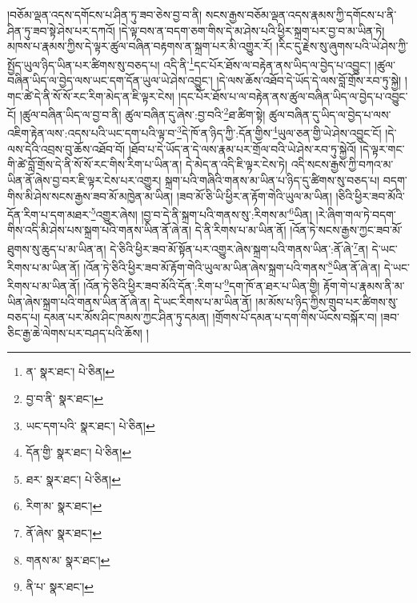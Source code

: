 །བཅོམ་ལྡན་འདས་དགོངས་པ་ཤིན་ཏུ་ཟབ་ཅེས་བྱ་བ་ནི། སངས་རྒྱས་བཅོམ་ལྡན་འདས་རྣམས་ཀྱི་དགོངས་པ་ནི་ཤིན་ཏུ་ཟབ་སྟེ་ཤེས་པར་དཀའོ། །དེ་ལྟ་བས་ན་བདག་ཅག་གིས་དེ་མ་ཤེས་པའི་ཕྱིར་སྐྲག་པར་བྱ་བ་མ་ཡིན་ཏེ། མཁས་པ་རྣམས་ཀྱིས་དེ་ལྟར་ཚུལ་བཞིན་བརྟགས་ན་སྐྲག་པར་མི་འགྱུར་རོ། །རིང་དུ་རྗེས་སུ་ཞུགས་པའི་ཡེ་ཤེས་ཀྱི་སྤྱོད་ཡུལ་ཉིད་ཡིན་པར་ཚིགས་སུ་བཅད་པ། འདི་ནི་\footnote{ན་  སྣར་ཐང་།  པེ་ཅིན། }དང་པོར་ཐོས་ལ་བརྟེན་ནས་ཡིད་ལ་བྱེད་པ་འབྱུང་། །ཚུལ་བཞིན་ཡིད་ལ་བྱེད་ལས་ཡང་དག་དོན་ཡུལ་ཡེ་ཤེས་འབྱུང་། །དེ་ལས་ཆོས་འཐོབ་དེ་ཡོད་དེ་ལས་བློ་གྲོས་རབ་ཏུ་སྐྱེ། །གང་ཚེ་དེ་ནི་སོ་སོ་རང་རིག་མེད་ན་ཇི་ལྟར་ངེས། །དང་པོར་ཐོས་པ་ལ་བརྟེན་ནས་ཚུལ་བཞིན་ཡིད་ལ་བྱེད་པ་འབྱུང་ངོ། །ཚུལ་བཞིན་ཡིད་ལ་བྱ་བ་ནི། ཚུལ་བཞིན་དུ་ཞེས་:བྱ་བའི་\footnote{བྱ་བ་ནི་  སྣར་ཐང་། }ཐ་ཚིག་སྟེ། ཚུལ་བཞིན་དུ་ཡིད་ལ་བྱེད་པ་ལས་འཇིག་རྟེན་ལས་:འདས་པའི་ཡང་དག་པའི་ལྟ་བ་\footnote{ཡང་དག་པའི་  སྣར་ཐང་།  པེ་ཅིན། }དེ་ཁོ་ན་ཉིད་ཀྱི་:དོན་གྱིས་\footnote{དོན་གྱི་  སྣར་ཐང་།  པེ་ཅིན། }ཡུལ་ཅན་གྱི་ཡེ་ཤེས་འབྱུང་ངོ། །དེ་ལས་དེའི་འབྲས་བུ་ཆོས་འཐོབ་བོ། །ཐོབ་པ་དེ་ཡོད་ན་དེ་ལས་རྣམ་པར་གྲོལ་བའི་ཡེ་ཤེས་རབ་ཏུ་སྐྱེའོ། །དེ་ལྟར་གང་གི་ཚེ་བློ་གྲོས་དེ་ནི་སོ་སོ་རང་གིས་རིག་པ་ཡིན་ན། དེ་མེད་ན་འདི་ཇི་ལྟར་ངེས་ཏེ། འདི་སངས་རྒྱས་ཀྱི་བཀའ་མ་ཡིན་ནོ་ཞེས་བྱ་བར་ཇི་ལྟར་ངེས་པར་འགྱུར། སྐྲག་པའི་གཞིའི་གནས་མ་ཡིན་པ་ཉིད་དུ་ཚིགས་སུ་བཅད་པ། བདག་གིས་མི་ཤེས་སངས་རྒྱས་ཟབ་མོ་མཁྱེན་མ་ཡིན། །ཟབ་མོ་ཅི་ཡི་ཕྱིར་ན་རྟོག་གེའི་ཡུལ་མ་ཡིན། །ཅིའི་ཕྱིར་ཟབ་མོའི་དོན་རིག་པ་དག་མཐར་\footnote{ཐར་  སྣར་ཐང་།  པེ་ཅིན། }འགྱུར་ཞེས། །བྱ་བ་དེ་ནི་སྐྲག་པའི་གནས་སུ་:རིགས་མ་\footnote{རིག་མ་  སྣར་ཐང་། }ཡིན། །རེ་ཞིག་གལ་ཏེ་བདག་གིས་འདི་མི་ཤེས་པས་སྐྲག་པའི་གནས་ཡིན་ནོ་ཞེ་ན། དེ་ནི་རིགས་པ་མ་ཡིན་ནོ། །འོན་ཏེ་སངས་རྒྱས་ཀྱང་ཟབ་མོ་ཐུགས་སུ་ཆུད་པ་མ་ཡིན་ན། དེ་ཅིའི་ཕྱིར་ཟབ་མོ་སྟོན་པར་འགྱུར་ཞེས་སྐྲག་པའི་གནས་ཡིན་:ནོ་ཞེ་\footnote{ནོ་ཞེས་  སྣར་ཐང་། }ན། དེ་ཡང་རིགས་པ་མ་ཡིན་ནོ། །འོན་ཏེ་ཅིའི་ཕྱིར་ཟབ་མོ་རྟོག་གེའི་ཡུལ་མ་ཡིན་ཞེས་སྐྲག་པའི་གནས་\footnote{གནས་མ་  སྣར་ཐང་། }ཡིན་ནོ་ཞེ་ན། དེ་ཡང་རིགས་པ་མ་ཡིན་ནོ། །འོན་ཏེ་ཅིའི་ཕྱིར་ཟབ་མོའི་དོན་:རིག་པ་\footnote{ནི་པ་  སྣར་ཐང་། }དག་ཁོ་ན་ཐར་པ་ཡིན་གྱི། རྟོག་གེ་པ་རྣམས་ནི་མ་ཡིན་ཞེས་སྐྲག་པའི་གནས་ཡིན་ནོ་ཞེ་ན། དེ་ཡང་རིགས་པ་མ་ཡིན་ནོ། །མ་མོས་པ་ཉིད་ཀྱིས་གྲུབ་པར་ཚིགས་སུ་བཅད་པ། དམན་པར་མོས་ཤིང་ཁམས་ཀྱང་ཤིན་ཏུ་དམན། །གྲོགས་པོ་དམན་པ་དག་གིས་ཡོངས་བསྐོར་བ། །ཟབ་ཅིང་རྒྱ་ཆེ་ལེགས་པར་བཤད་པའི་ཆོས། །
